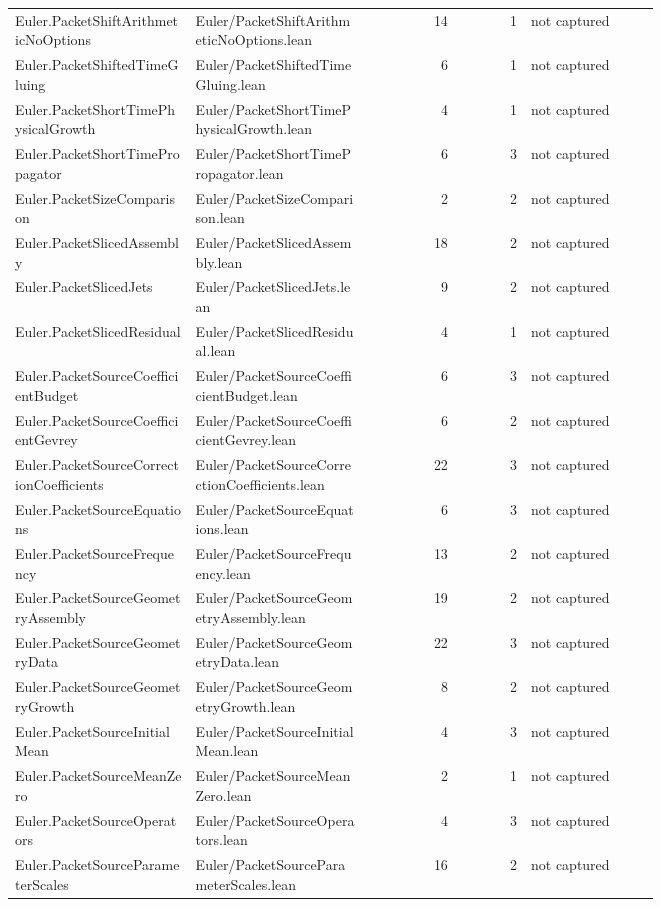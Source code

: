 \documentclass[10pt]{article}
\begin{document}
\begin{longtable}{p{0.28\linewidth}p{0.27\linewidth}r r p{0.20\linewidth}}
Euler.PacketShiftArithmeticNoOptions & Euler/PacketShiftArithmeticNoOptions.lean & 14 & 1 & not captured\\
Euler.PacketShiftedTimeGluing & Euler/PacketShiftedTimeGluing.lean & 6 & 1 & not captured\\
Euler.PacketShortTimePhysicalGrowth & Euler/PacketShortTimePhysicalGrowth.lean & 4 & 1 & not captured\\
Euler.PacketShortTimePropagator & Euler/PacketShortTimePropagator.lean & 6 & 3 & not captured\\
Euler.PacketSizeComparison & Euler/PacketSizeComparison.lean & 2 & 2 & not captured\\
Euler.PacketSlicedAssembly & Euler/PacketSlicedAssembly.lean & 18 & 2 & not captured\\
Euler.PacketSlicedJets & Euler/PacketSlicedJets.lean & 9 & 2 & not captured\\
Euler.PacketSlicedResidual & Euler/PacketSlicedResidual.lean & 4 & 1 & not captured\\
Euler.PacketSourceCoefficientBudget & Euler/PacketSourceCoefficientBudget.lean & 6 & 3 & not captured\\
Euler.PacketSourceCoefficientGevrey & Euler/PacketSourceCoefficientGevrey.lean & 6 & 2 & not captured\\
Euler.PacketSourceCorrectionCoefficients & Euler/PacketSourceCorrectionCoefficients.lean & 22 & 3 & not captured\\
Euler.PacketSourceEquations & Euler/PacketSourceEquations.lean & 6 & 3 & not captured\\
Euler.PacketSourceFrequency & Euler/PacketSourceFrequency.lean & 13 & 2 & not captured\\
Euler.PacketSourceGeometryAssembly & Euler/PacketSourceGeometryAssembly.lean & 19 & 2 & not captured\\
Euler.PacketSourceGeometryData & Euler/PacketSourceGeometryData.lean & 22 & 3 & not captured\\
Euler.PacketSourceGeometryGrowth & Euler/PacketSourceGeometryGrowth.lean & 8 & 2 & not captured\\
Euler.PacketSourceInitialMean & Euler/PacketSourceInitialMean.lean & 4 & 3 & not captured\\
Euler.PacketSourceMeanZero & Euler/PacketSourceMeanZero.lean & 2 & 1 & not captured\\
Euler.PacketSourceOperators & Euler/PacketSourceOperators.lean & 4 & 3 & not captured\\
Euler.PacketSourceParameterScales & Euler/PacketSourceParameterScales.lean & 16 & 2 & not captured\\

\end{longtable}
\end{document}
